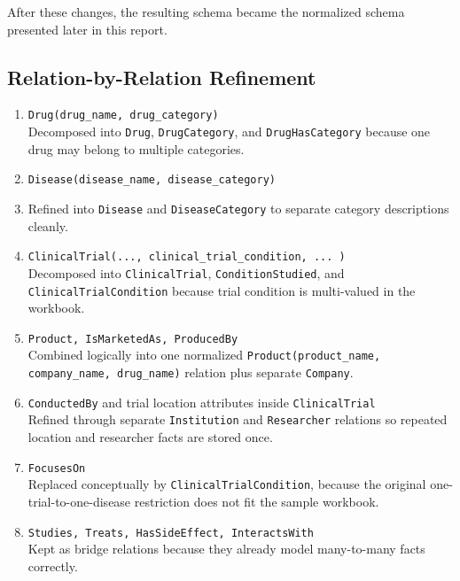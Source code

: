 \documentclass[12pt,a4paper]{article}
\begin{document}
After these changes, the resulting schema became the normalized schema presented later in this
report.

\subsection{Relation-by-Relation Refinement}
\begin{enumerate}[leftmargin=1.5em]
    \item {\small\texttt{Drug(drug\_name, drug\_category)}}\\
    Decomposed into \texttt{Drug}, \texttt{DrugCategory}, and \texttt{DrugHasCategory} because one drug may belong to multiple categories.

    \item {\small\texttt{Disease(disease\_name, disease\_category)}}\\
    \item 
    Refined into \texttt{Disease} and \texttt{DiseaseCategory} to separate category descriptions cleanly.

    \item {\small\texttt{ClinicalTrial(..., clinical\_trial\_condition, ... )}}\\
    Decomposed into \texttt{ClinicalTrial}, \texttt{ConditionStudied}, and\\
    \texttt{ClinicalTrialCondition} because trial condition is multi-valued in the workbook.

    \item {\small\texttt{Product, IsMarketedAs, ProducedBy}}\\
    Combined logically into one normalized \texttt{Product(product\_name, company\_name, drug\_name)} relation plus separate \texttt{Company}.

    \item {\small\texttt{ConductedBy} and trial location attributes inside \texttt{ClinicalTrial}}\\
    Refined through separate \texttt{Institution} and \texttt{Researcher} relations so repeated location and researcher facts are stored once.

    \item {\small\texttt{FocusesOn}}\\
    Replaced conceptually by \texttt{ClinicalTrialCondition}, because the original one-trial-to-one-disease restriction does not fit the sample workbook.

    \item {\small\texttt{Studies, Treats, HasSideEffect, InteractsWith}}\\
    Kept as bridge relations because they already model many-to-many facts correctly.
\end{enumerate}
\end{document}
